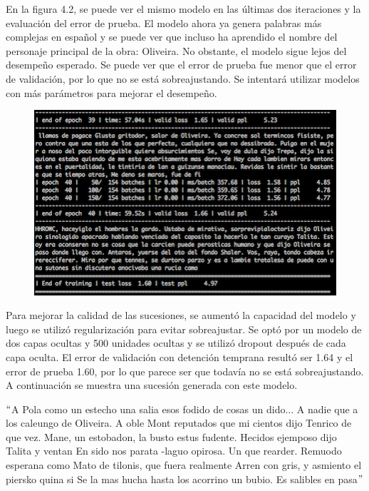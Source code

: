 En la figura 4.2, se puede ver el mismo modelo en las últimas dos iteraciones y la evaluación del error de prueba. El modelo ahora ya genera palabras más complejas en español y se puede ver que incluso ha aprendido el nombre del personaje principal de la obra: Oliveira. No obstante, el modelo sigue lejos del desempeño esperado. Se puede ver que el error de prueba fue menor que el error de validación, por lo que no se está sobreajustando. Se intentará utilizar modelos con más parámetros para mejorar el desempeño.

\begin{figure}[h]
\begin{center}
\includegraphics{./imag/ray12.png}
\end{center}
\caption{}
\end{figure}

\vspace{1em}

Para mejorar la calidad de las sucesiones, se aumentó la capacidad del modelo y luego se utilizó regularización para evitar sobreajustar. Se optó por un modelo de dos capas ocultas y 500 unidades ocultas y se utilizó dropout después de cada capa oculta. El error de validación con detención temprana resultó ser 1.64 y el error de prueba 1.60, por lo que parece ser que todavía no se está sobreajustando. A continuación se muestra una sucesión generada con este modelo. 

\vspace{1em}

$``$A Pola como un estecho una salia esos fodido de cosas un dido... A nadie que a los caleungo de Oliveira. A oble Mont reputados que mi cientos dijo Tenrico de que vez. Mane, un estobadon, la busto estus fudente. Hecidos ejemposo dijo Talita y ventan En sido nos parata -laguo opirosa. Un que rearder. Remuodo esperana como Mato de tilonis, que fuera realmente Arren con gris, y asmiento el piersko quina si Se la mas hucha hasta los acorrino un bubio. Es salibles en pasa$"$

